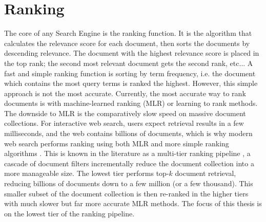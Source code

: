 \section{Ranking}
The core of any Search Engine is the ranking function. It is the algorithm that calculates the relevance score for each document, then sorts the documents by descending relevance. The document with the highest relevance score is placed in the top rank; the second most relevant document gets the second rank, etc... A fast and simple ranking function is sorting by term frequency, i.e. the document which contains the most query terms is ranked the highest. However, this simple approach is not the most accurate. Currently, the most accurate way to rank documents is with machine-learned ranking (MLR) or learning to rank methods. The downside to MLR is the comparatively slow speed on massive document collections. For interactive web search, users expect retrieval results in a few milliseconds, and the web contains billions of documents, which is why modern web search performs ranking using both MLR and more simple ranking algorithms \cite{baeza1999modern}. This is known in the literature as a multi-tier ranking pipeline \cite{risvik2003multi}, a cascade of document filters incrementally reduce the document collection into a more manageable size. The lowest tier performs top-$k$ document retrieval, reducing billions of documents down to a few million (or a few thousand). This smaller subset of the document collection is then re-ranked in the higher tiers with much slower but far more accurate MLR methods. The focus of this thesis is on the lowest tier of the ranking pipeline.






